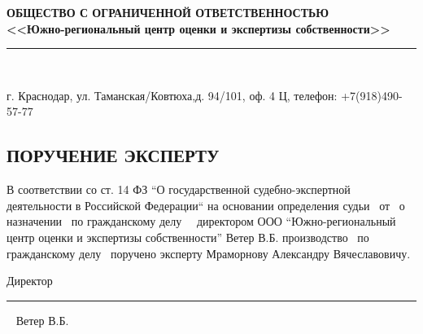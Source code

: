 \setcounter{page}{1}
\pagestyle{empty} %
%
%
\begin{center}
	\large\textbf{ОБЩЕСТВО С ОГРАНИЧЕННОЙ ОТВЕТСТВЕННОСТЬЮ \\[-1.5mm] <<Южно-региональный   центр оценки и экспертизы собственности>> \\[-5mm]}
	\noindent\rule{\textwidth}{1pt}\\[-6mm]  %
\end{center}

\begin{center}
	\begin{footnotesize}
		\vspace{-3.5mm}г. Краснодар, ул. Таманская/Ковтюха,д. 94/101, оф. 4 Ц, 
		телефон:  +7(918)490-57-77\\[5mm]
	\end{footnotesize}	
\end{center}


\vspace{20mm}


\begin{center}
	\section{{\Large \textbf{ПОРУЧЕНИЕ ЭКСПЕРТУ}}}
\end{center}




В соответствии со ст. 14  ФЗ “О государственной судебно-экспертной деятельности в Российской Федерации“ на основании определения судьи \sud \,  от \dataopr  \, о назначении \opr \, по гражданскому делу \delonum \,  \isk \,  директором ООО \enquote{Южно-региональный   центр оценки и экспертизы собственности}  Ветер В.Б. производство \opr \, по гражданскому делу \delonum \, поручено эксперту    Мраморнову Александру Вячеславовичу. 






\vspace{30mm}

Директор \hfill   \rule{4cm}{0.1 mm} \,\,\,  Ветер В.Б.     